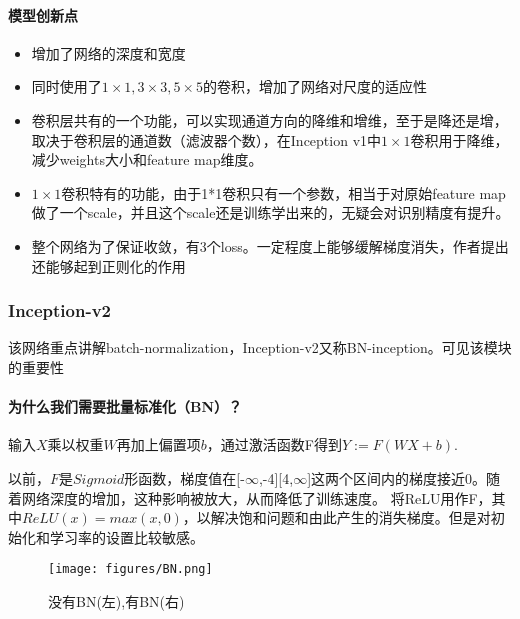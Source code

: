 \documentclass{article}
\newcommand{\tao}[1]{\todo[color=red!20,size=\footnotesize]{T: #1}{}}
\begin{document}
\begin{CJK}{UTF8}{gbsn}
\paragraph{模型创新点}
\begin{itemize}
\item 增加了网络的深度和宽度
\item 同时使用了$1 \times 1, 3 \times 3, 5 \times 5$的卷积，增加了网络对尺度的适应性
\item 卷积层共有的一个功能，可以实现通道方向的降维和增维，至于是降还是增，取决于卷积层的通道数（滤波器个数），在Inception v1中$1 \times 1$卷积用于降维，减少weights大小和feature map维度。
\item $1\times 1$卷积特有的功能，由于1*1卷积只有一个参数，相当于对原始feature map做了一个scale，并且这个scale还是训练学出来的，无疑会对识别精度有提升。
\item 整个网络为了保证收敛，有3个loss。一定程度上能够缓解梯度消失，作者提出还能够起到正则化的作用
\end{itemize}

\subsubsection{Inception-v2}
    该网络重点讲解batch-normalization，Inception-v2又称BN-inception。可见该模块的重要性


\paragraph{为什么我们需要批量标准化（BN）？}
输入$X$乘以权重$W$再加上偏置项$b$，通过激活函数F得到$Y:= F(WX + b)$.

以前，$F$是$Sigmoid$形函数，梯度值在[-$\infty$,-4][4,$\infty$]这两个区间内的梯度接近0。随着网络深度的增加，这种影响被放大，从而降低了训练速度。
将ReLU用作F，其中$ReLU(x)=max(x, 0)$，以解决饱和问题和由此产生的消失梯度。但是对初始化和学习率的设置比较敏感。

\begin{figure}[!h]
    \centering
    \texttt{[image: figures/BN.png]}
    \caption{没有BN(左),有BN(右)}
    \label{fig:bn}
\end{figure}



\end{CJK}
\end{document}
